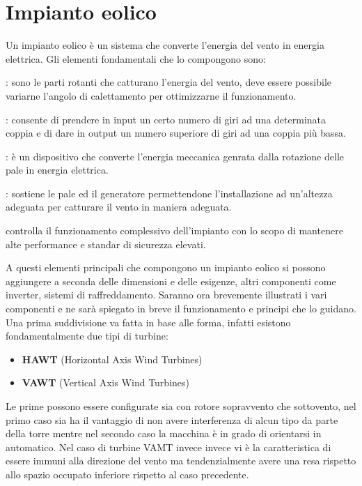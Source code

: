 \section{Impianto eolico}
Un impianto eolico è un sistema che converte l'energia del vento in energia elettrica.
Gli elementi fondamentali che lo compongono sono:
\begin{description}[labelindent=5mm]
    \item[$\bullet$ Pale eoliche]: sono le parti rotanti che catturano l'energia del vento, deve essere possibile variarne l'angolo di calettamento per ottimizzarne il funzionamento.
    \item[$\bullet$ Moltiplicatore di giri]: consente di prendere in input un certo numero di giri ad una determinata coppia e di dare in output un numero superiore di giri ad una coppia più bassa.
    \item[$\bullet$ Generatore eolico]: è un dispositivo che converte l'energia meccanica genrata dalla rotazione delle pale in energia elettrica.
    \item[$\bullet$ Torre eolica]: sostiene le pale ed il generatore permettendone l'installazione ad un'altezza adeguata per catturare il vento in maniera adeguata.
    \item[$\bullet$ Elettronica di controllo] controlla il funzionamento complessivo dell'impianto con lo scopo di mantenere alte performance e standar di sicurezza elevati.
\item \end{description}
A questi elementi principali che compongono un impianto eolico si possono aggiungere a seconda delle dimensioni e delle esigenze, altri componenti come inverter, sistemi di raffreddamento.
Saranno ora brevemente illustrati i vari componenti e ne sarà spiegato in breve il funzionamento e principi che lo guidano.
Una prima suddivisione va fatta in base alle forma, infatti esistono fondamentalmente due tipi di turbine:
\begin{itemize}
    \item \textbf{HAWT} (Horizontal Axis Wind Turbines)
    \item \textbf{VAWT} (Vertical Axis Wind Turbines)
\end{itemize}
Le prime possono essere configurate sia con rotore sopravvento che sottovento, nel primo caso sia ha il vantaggio di non avere interferenza di alcun tipo da parte della torre mentre nel secondo caso la macchina è in grado di orientarsi in automatico.
Nel caso di turbine VAMT invece invece vi è la caratteristica di essere immuni alla direzione del vento ma tendenzialmente avere una resa rispetto allo spazio occupato inferiore rispetto al caso precedente.
